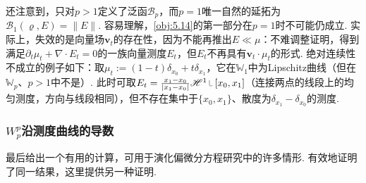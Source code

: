\begin{remark}\label{obj:5.23}
还注意到，只对$p>1$定义了泛函$\mathscr B_p$，而$p=1$唯一自然的延拓为$\mathscr B_1(\varrho,E)=\|E\|$. 容易理解，\autoref{obj:5.14}的第一部分在$p=1$时不可能仍成立. 实际上，失效的是向量场$\mathbf v_t$的存在性，因为不能再推出$E\ll\mu$：不难调整证明，得到满足$\partial_t\mu_t+\nabla\cdot E_t=0$的一族向量测度$E_t$，但$E_t$不再具有$\mathbf v_t\cdot\mu_t$的形式. 绝对连续性不成立的例子如下：取$\mu_t:=(1-t)\delta_{x_0}+t\delta_{x_1}$，它在$\mathbb W_1$中为Lipschitz曲线（但在$\mathbb W_p$、$p>1$中不是）. 此时可取$E_t=\frac{x_1-x_0}{|x_1-x_0|}\mathscr H^1\restr[x_0,x_1]$（连接两点的线段上的均匀测度，方向与线段相同），但不存在集中于$\{x_0,x_1\}$、散度为$\delta_{x_1}-\delta_{x_0}$的测度.
\end{remark}

\subsubsection[Wasserstein距离的幂沿测度曲线的导数]{$W_p^p$沿测度曲线的导数}\label{sec:5.3.5}

最后给出一个有用的计算，可用于演化偏微分方程研究中的许多情形. \cite{b15}有效地证明了同一结果，这里提供另一种证明.

